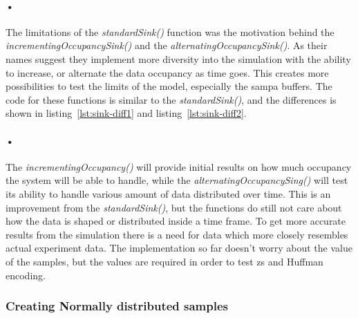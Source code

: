 \documentclass[a4paper, 12pt]{report}
\begin{document}
\begin{minipage}{\linewidth}

\end{minipage}

\paragraph{•}
The limitations of the \textit{standardSink()} function was the motivation behind the \textit{incrementingOccupancySink()} and the \textit{alternatingOccupancySink()}.
As their names suggest they implement more diversity into the simulation with the ability to increase, or alternate the data occupancy as time goes.
This creates more possibilities to test the limits of the model, especially the \gls{sampa} buffers.
The code for these functions is similar to the \textit{standardSink()}, and the differences is shown in listing~\ref{lst:sink-diff1} and listing~\ref{lst:sink-diff2}.

\begin{minipage}{\linewidth}


\end{minipage}

\paragraph{•} 
The \textit{incrementingOccupancy()} will provide initial results on how much occupancy the system will be able to handle, while the \textit{alternatingOccupancySing()} will test its ability to handle various amount of data distributed over time.
This is an improvement from the \textit{standardSink()}, but the functions do still not care about how the data is shaped or distributed inside a time frame.
To get more accurate results from the simulation there is a need for data which more closely resembles actual experiment data.
The implementation so far doesn't worry about the value of the samples, but the values are required in order to test \gls{zs} and Huffman encoding.

\subsubsection{Creating Normally distributed samples}
\label{subsubsec:normal-distribution}
\end{document}
